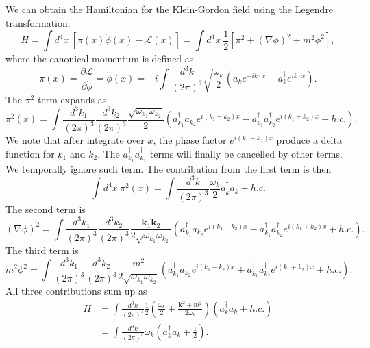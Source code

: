 \documentclass[aps,prb,superscriptaddress,nofootinbib]{revtex4}
\begin{document}
We can obtain the Hamiltonian for the Klein-Gordon field using the Legendre transformation:
\begin{equation}
	H = \int d^4 x\ \left[\pi(x) \dot{\phi}(x) - \mathcal L(x) \right] 
	= \int d^4 x\ \frac{1}{2} \left[\pi^2 + (\nabla \phi)^2 + m^2 \phi^2 \right],
\end{equation}
where the canonical momentum is defined as
\begin{equation}
	\pi(x) = \frac{\partial \mathcal L}{\partial \dot{\phi}} = \dot{\phi}(x) 
	= -i\int \frac{d^{3} k}{(2\pi)^{3}} \sqrt{\frac{\omega_{k}}{2}}\left(a_k 
		e^{-i k \cdot x} - a_k^{\dagger} e^{i k \cdot x}\right).
\end{equation}
The $\pi^2$ term expands as
\begin{equation}
	\pi^2(x) = \int \frac{d^{3} k_1}{(2\pi)^{3}} \frac{d^{3} k_2}{(2\pi)^{3}}
		\frac{\sqrt{\omega_{k_1} \omega_{k_2}}}{2} \left(a^\dagger_{k_1}a_{k_2}e^{i(k_1-k_2)x} - a^\dagger_{k_1} a^\dagger_{k_2} e^{i(k_1+k_2)x} + h.c.\right).
\end{equation}
We note that after integrate over $x$, the phase factor $e^{i(k_1-k_2)x}$ produce a delta function for $k_1$ and $k_2$.
The $a^\dagger_{k_1} a^\dagger_{k_2}$ terms will finally be cancelled by other terms.
We temporally ignore such term.
The contribution from the first term is then
\begin{equation}
	\int d^4 x\ \pi^2(x) = \int \frac{d^3 k}{(2\pi)^3} \frac{\omega_k}{2} a_k^\dagger a_k + h.c.
\end{equation}
The second term is
\begin{equation}
	(\nabla \phi)^2 = \int \frac{d^{3} k_1}{(2\pi)^{3}} \frac{d^{3} k_2}{(2\pi)^{3}}
		\frac{\bm k_1 \bm k_2}{2\sqrt{\omega_{k_1}\omega_{k_2}}} \left(a^\dagger_{k_1}a_{k_2}e^{i(k_1-k_2)x} - a^\dagger_{k_1} a^\dagger_{k_2} e^{i(k_1+k_2)x} + h.c.\right).
\end{equation}
The third term is
\begin{equation}
	m^2 \phi^2 = \int \frac{d^{3} k_1}{(2\pi)^{3}} \frac{d^{3} k_2}{(2\pi)^{3}}
		\frac{m^2}{2\sqrt{\omega_{k_1}\omega_{k_2}}} \left(a^\dagger_{k_1}a_{k_2}e^{i(k_1-k_2)x} + a^\dagger_{k_1} a^\dagger_{k_2} e^{i(k_1+k_2)x} + h.c.\right).
\end{equation}
All three contributions sum up as
\begin{equation}
\begin{aligned}
	H &= \int \frac{d^3 k}{(2\pi)^3} \frac{1}{2}\left(\frac{\omega_k}{2} + \frac{\bm k^2+m^2}{2 \omega_k}\right) \left(a_k^\dagger a_k + h.c. \right) \\
	&= \int \frac{d^3 k}{(2\pi)^3} \omega_k \left(a_k^\dagger a_k +\frac{1}{2} \right).
\end{aligned}
\end{equation}
\end{document}
